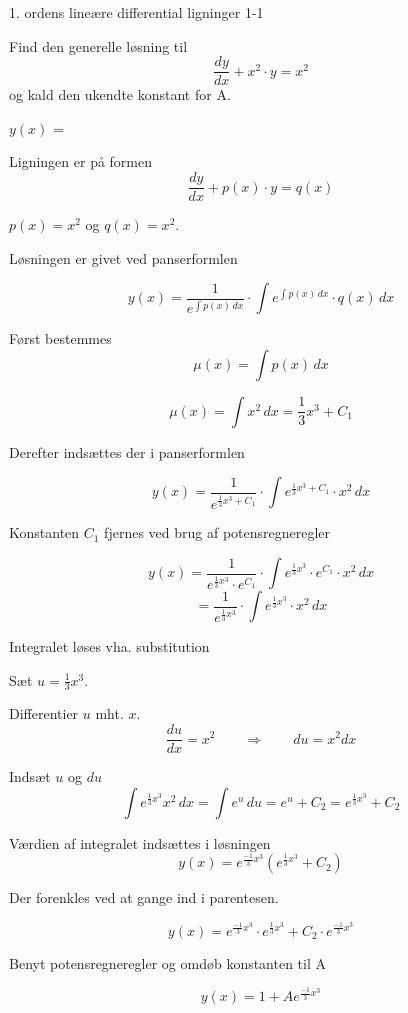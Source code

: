 \documentclass{article}
\begin{document}
\tableofcontents
\newpage

\begin{exercise}{1. ordens lineære differential ligninger 1-1}


Find den generelle løsning til
\[
\frac{dy}{dx} + x^2 \cdot y = x^2
\]
og kald den ukendte konstant for A.

$y(x)$ = 



\hint

Ligningen er på formen
\[
\frac{dy}{dx} + p(x) \cdot y = q(x)
\]

\hint

$p(x)=x^2$ og $q(x)=x^2$.

\hint

Løsningen er givet ved panserformlen


\hint

\[
y(x) = \frac{1}{e^{\int p(x) \, dx}} \cdot \int e^{\int p(x) \, dx} \cdot q(x) \, dx
\]

\hint

Først bestemmes
\[
\mu(x) = \int p(x) \, dx
\]

\hint
\[
\mu(x) = \int x^2 \, dx = \frac{1}{3} x^3 + C_1
\]

\hint
Derefter indsættes der i panserformlen

\hint

\[
y(x) = \frac{1}{e^{\frac{1}{3}x^3 + C_1}} \cdot \int e^{\frac{1}{3}x^3 + C_1} \cdot x^2 \, dx
\]


\hint

Konstanten $C_1$ fjernes ved brug af potensregneregler

\hint
\[
y(x) = \frac{1}{e^{\frac{1}{3}x^3} \cdot e^{C_1}} \cdot \int e^{\frac{1}{3}x^3} \cdot e^{C_1} \cdot x^2 \, dx
\]
\[
 = \frac{1}{e^{\frac{1}{3}x^3}} \cdot \int e^{\frac{1}{3}x^3} \cdot x^2 \, dx
\]

\hint

Integralet løses vha. substitution


\hint
Sæt $u = \frac{1}{3}x^3$.

\hint

Differentier $u$ mht. $x$.
\[
\frac{du}{dx} = x^2 \qquad\Rightarrow \qquad du = x^2 dx
\]

\hint
Indsæt $u$ og $du$
\[
\int e^{\frac{1}{3}x^3}x^2 \, dx = \int e^{u} \, du = e^{u} + C_2 = e^{\frac{1}{3}x^3} + C_2
\]

\hint

Værdien af integralet indsættes i løsningen
\[
y(x) = e^{\frac{-1}{3}x^3} \left( e^{\frac{1}{3}x^3}+ C_2\right)
\]

\hint

Der forenkles ved at gange ind i parentesen.

\hint
\[
y(x) = e^{\frac{-1}{3}x^3} \cdot e^{\frac{1}{3}x^3} + C_2 \cdot e^{\frac{-1}{3}x^3}
\]

\hint

Benyt potensregneregler og omdøb konstanten til A

\hint
\[
y(x) = 1 + A e^{\frac{-1}{3}x^3}
\]


\end{exercise}
\end{document}
